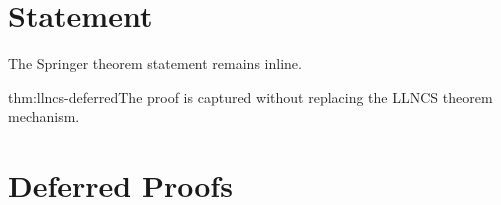 \documentclass[runningheads,envcountsect]{llncs}
\begin{document}
\section{Statement}
\begin{theoremE}\label{thm:llncs-deferred}The Springer theorem statement remains inline.\end{theoremE}
\begin{deferproof}{thm:llncs-deferred}The proof is captured without replacing the LLNCS theorem mechanism.\end{deferproof}
\appendix
\section{Deferred Proofs}
\printDeferredProofs
\end{document}
